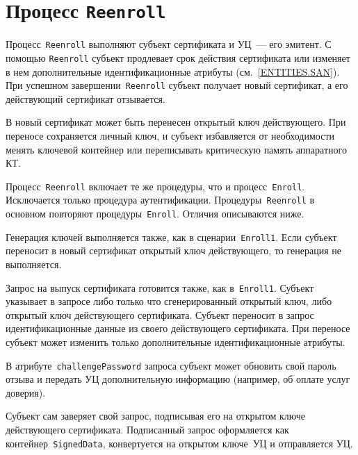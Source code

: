 \section{Процесс \texttt{Reenroll}}\label{PROCESSES.Reenroll}

Процесс~\texttt{Reenroll} выполняют субъект сертификата и УЦ~--- его 
эмитент. С помощью \texttt{Reenroll} субъект продлевает 
срок действия сертификата или изменяет в нем дополнительные
идентификационные атрибуты (см.~\ref{ENTITIES.SAN}).
%
При успешном завершении~\texttt{Reenroll} субъект получает новый 
сертификат, а его действующий сертификат отзывается. 

В новый сертификат может быть перенесен открытый ключ
действующего. При переносе сохраняется личный ключ,
и субъект избавляется от необходимости менять ключевой
контейнер или переписывать критическую память аппаратного КТ.

Процесс~\texttt{Reenroll} включает те же процедуры, 
что и процесс~\texttt{Enroll}. Исключается только процедура 
аутентификации. Процедуры~\texttt{Reenroll} в основном повторяют 
процедуры~\texttt{Enroll}. Отличия описываются ниже.

Генерация ключей выполняется также, как в сценарии~\texttt{Enroll1}. 
Если субъект переносит в новый сертификат открытый ключ действующего, то 
генерация не выполняется. 

Запрос на выпуск сертификата готовится также, как в~\texttt{Enroll1}.
%
Субъект указывает в запросе либо только что сгенерированный открытый ключ,
либо открытый ключ действующего сертификата.
%
Субъект переносит в запрос идентификационные данные из своего действующего 
сертификата. При переносе субъект может изменить только дополнительные 
идентификационные атрибуты. 

В атрибуте~\texttt{challengePassword} запроса субъект 
может обновить свой пароль отзыва и передать УЦ дополнительную
информацию (например, об оплате услуг доверия).

Субъект сам заверяет свой запрос, подписывая его на открытом ключе 
действующего сертификата. Подписанный запрос оформляется как 
контейнер~\texttt{SignedData}, конвертуется на открытом ключе~УЦ
и отправляется УЦ.

